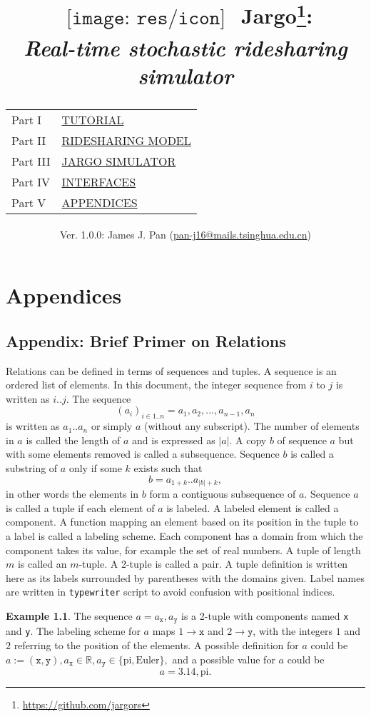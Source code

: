 \documentclass{report}
\title{
  $
  \begin{array}{l}
  \texttt{[image: res/icon]}
  \end{array}
  $
  Jargo\footnote{\url{https://github.com/jargors}}:\\
  \large{\textbf{\textit{Real-time stochastic ridesharing simulator}}}\\
  \vspace{2em}
  {
    \small
    \begin{tabular}{lp{.6\textwidth}}
    \toprule
    Part I  &\hyperref[part-tutorial]{\textsc{TUTORIAL}}\\
    Part II &\hyperref[part-model]{\textsc{RIDESHARING MODEL}}\\
    Part III&\hyperref[part-simulator]{\textsc{JARGO SIMULATOR}}\\
    Part IV &\hyperref[part-interfaces]{\textsc{INTERFACES}}\\
    Part V  &\hyperref[part-appendices]{\textsc{APPENDICES}}\\
    \bottomrule
    \end{tabular}
  }
}
\author{
  \small{Ver. 1.0.0: James J. Pan (\href{mailto:pan-j16@mails.tsinghua.edu.cn}{pan-j16@mails.tsinghua.edu.cn})}
}
\theoremstyle{definition}                   %
\newtheorem{example}{Example}
\begin{document}
\maketitle
\pagestyle{noweb}

\renewcommand{\thepage}{\roman{page}}
\setcounter{page}{1}

\tableofcontents



\part{Appendices}
\label{part-appendices}

\appendix

\chapter{Appendix: Brief Primer on Relations}
\label{ap-primer}

Relations can be defined in terms of sequences and tuples.  A sequence is an
ordered list of elements.  In this document, the integer sequence from $i$ to
$j$ is written as $i..j$. The sequence $$(a_i)_{i\in
1..n}=a_1,a_2,...,a_{n-1},a_n$$ is written as $a_1..a_n$ or simply $a$ (without
any subscript). The number of elements in $a$ is called the length of $a$ and
is expressed as $|a|$.  A copy $b$ of sequence $a$ but with some elements
removed is called a subsequence.  Sequence $b$ is called a substring of $a$
only if some $k$ exists such that $$b=a_{1+k}..a_{|b|+k},$$ in other words the
elements in $b$ form a contiguous subsequence of $a$.  Sequence $a$ is called a
tuple if each element of $a$ is labeled. A labeled element is called a
component.  A function mapping an element based on its position in the tuple to
a label is called a labeling scheme.  Each component has a domain from which
the component takes its value, for example the set of real numbers.  A tuple of
length $m$ is called an $m$-tuple. A 2-tuple is called a pair.  A tuple
definition is written here as its labels surrounded by parentheses with the
domains given. Label names are written in \texttt{typewriter} script to avoid
confusion with positional indices.

\begin{example}
\label{ex:tuple}
The sequence $a=a_\texttt{x},a_\texttt{y}$ is a 2-tuple with components named
\texttt{x} and \texttt{y}.  The labeling scheme for $a$ maps $1\rightarrow
\texttt{x}$ and $2\rightarrow \texttt{y}$, with the integers $1$ and $2$
referring to the position of the elements. A possible definition for $a$ could
be $a:=(\texttt{x},\texttt{y}), a_\texttt{x}\in\mathbb{R},
a_\texttt{y}\in\{\textrm{pi},\textrm{Euler}\},$ and a possible value for $a$
could be $$a=3.14,\textrm{pi}.$$
\end{example}
\end{document}
